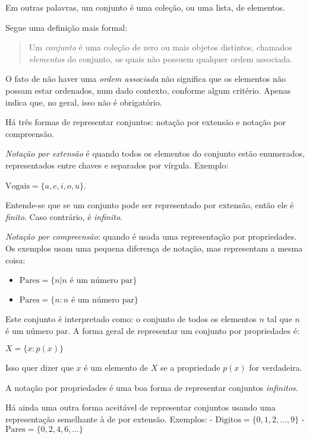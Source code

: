 \documentclass{article}
\begin{document}
Em outras palavras, um conjunto é uma coleção, ou uma lista, de
elementos.

Segue uma definição mais formal:

\begin{quote}
Um \emph{conjunto} é uma coleção de zero ou mais objetos distintos,
chamados \emph{elementos} do conjunto, os quais não possuem qualquer
ordem associada.
\end{quote}

O fato de não haver uma \emph{ordem associada} não significa que os
elementos não possam estar ordenados, num dado contexto, conforme algum
critério. Apenas indica que, no geral, isso não é obrigatório.

Há três formas de representar conjuntos: notação por extensão e notação
por compreensão.

\emph{Notação por extensão} é quando todos os elementos do conjunto
estão enumerados, representados entre chaves e separados por vírgula.
Exemplo:

\(\mbox{Vogais} = \{a, e, i, o, u\}\).

Entende-se que se um conjunto pode ser representado por extensão, então
ele é \emph{finito}. Caso contrário, é \emph{infinito}.

\emph{Notação por compreensão}: quando é usada uma representação por
propriedades. Os exemplos usam uma pequena diferença de notação, mas
representam a mesma coisa:

\begin{itemize}
\itemsep1pt\parskip0pt
\item
  \(\mbox{Pares} = \{ n | n \mbox{ é um número par}\}\)
\item
  \(\mbox{Pares} = \{ n : n \mbox{ é um número par}\}\)
\end{itemize}

Este conjunto é interpretado como: o conjunto de todos os elementos
\(n\) tal que \(n\) é um número par. A forma geral de representar um
conjunto por propriedades é:

\(X = \{x : p(x)\}\)

Isso quer dizer que \(x\) é um elemento de \(X\) se a propriedade
\(p(x)\) for verdadeira.

A notação por propriedades é uma boa forma de representar conjuntos
\emph{infinitos}.

Há ainda uma outra forma aceitável de representar conjuntos usando uma
representação semelhante à de por extensão. Exemplos: -
\(\mbox{Digitos} = \{0, 1, 2, ..., 9\}\) -
\(\mbox{Pares} = \{0, 2, 4, 6, ...\}\)
\end{document}
